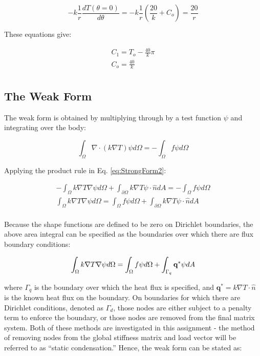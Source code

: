 \documentclass[10pt]{article}
\begin{document}
\begin{equation}
-k\frac{1}{r}\frac{dT(\theta=0)}{d\theta}=-k\frac{1}{r}\left(\frac{20}{k}+C_o\right)=\frac{20}{r}
\end{equation}

These equations give:

\begin{equation}
\begin{aligned}
C_1=T_o-\frac{40}{k}\pi\\
C_o=\frac{40}{k}\\
\end{aligned}
\end{equation}

\subsection{The Weak Form}

The weak form is obtained by multiplying through by a test function \(\psi\) and integrating over the body:

\begin{equation}
\label{eq:StrongForm2}
\int_{\Omega}\nabla\cdot(k\nabla T)\psi d\Omega=-\int_{\Omega}f\psi d\Omega
\end{equation}

Applying the product rule in Eq. \eqref{eq:StrongForm2}:

\begin{equation}
\begin{aligned}
-\int_{\Omega}k\nabla T\nabla\psi d\Omega+\int_{\partial\Omega}k\nabla T\psi\cdot\hat{n}dA=-\int_{\Omega}f\psi d\Omega\\
\int_{\Omega}k\nabla T\nabla\psi d\Omega=\int_{\Omega}f\psi d\Omega+\int_{\partial\Omega}k\nabla T\psi\cdot\hat{n}dA\\
\end{aligned}
\end{equation}

Because the shape functions are defined to be zero on Dirichlet boundaries, the above area integral can be specified as the boundaries over which there are flux boundary conditions:

\begin{equation}
\int_{\Omega}k\nabla T\nabla\psi d\Omega=\int_{\Omega}f\psi d\Omega+\int_{\Gamma_q}\textbf{q}^{*}\psi dA\\
\end{equation}

where \(\Gamma_q\) is the boundary over which the heat flux is specified, and \(\textbf{q}^{*}=k\nabla T\cdot\hat{n}\) is the known heat flux on the boundary. On boundaries for which there are Dirichlet conditions, denoted as \(\Gamma_d\), those nodes are either subject to a penalty term to enforce the boundary, or those nodes are removed from the final matrix system. Both of these methods are investigated in this assignment - the method of removing nodes from the global stiffness matrix and load vector will be referred to as ``static condensation.'' Hence, the weak form can be stated as:
\end{document}
